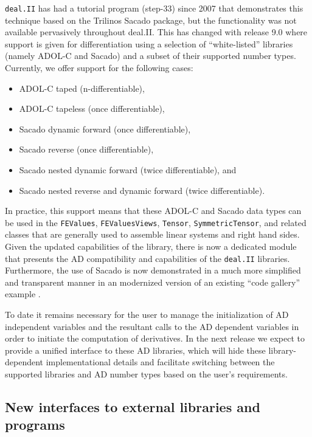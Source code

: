 \documentclass{ansarticle-preprint}
\newcommand{\specialword}[1]{\texttt{#1}}
\newcommand{\dealii}{{\specialword{deal.II}}\xspace}
\begin{document}
\dealii has had a tutorial program (step-33) since 2007 that
demonstrates this technique based on the Trilinos Sacado \cite{Bartlett2006a} package, but
the functionality was not available pervasively throughout
deal.II.
This has changed with release 9.0 where support is given for differentiation
using a selection of ``white-listed'' libraries (namely ADOL-C \citep{Griewank1996a}
and Sacado) and a subset of their supported number types. Currently,
we offer support for the following cases:
\begin{itemize}
\item ADOL-C taped (n-differentiable),
\item ADOL-C tapeless (once differentiable),
\item Sacado dynamic forward (once differentiable),
\item Sacado reverse (once differentiable),
\item Sacado nested dynamic forward (twice differentiable), and
\item Sacado nested reverse and dynamic forward (twice differentiable).
\end{itemize}
In practice, this support means that these ADOL-C and Sacado data
types can be used in the \texttt{FEValues}, \texttt{FEValuesViews},
\texttt{Tensor}, \texttt{SymmetricTensor},
and related classes that are generally used to assemble linear systems
and right hand sides.
Given the updated capabilities of the library, there is now a dedicated module
that presents the AD compatibility and capabilities of the \dealii libraries.
Furthermore, the use of Sacado is now  demonstrated in a much more simplified
and transparent manner in an modernized version of an existing ``code gallery''
example \cite{Pelteret2016a}.

To date it remains necessary for the user  to manage the initialization of AD
independent variables and the resultant calls  to the AD dependent variables
in order to initiate the computation of derivatives.
In the next release we expect to provide a unified interface to these
AD libraries, which will hide these library-dependent implementational details
and facilitate switching between the supported libraries and AD number types
based on the user's requirements.


\subsection{New interfaces to external libraries and programs}
\end{document}
